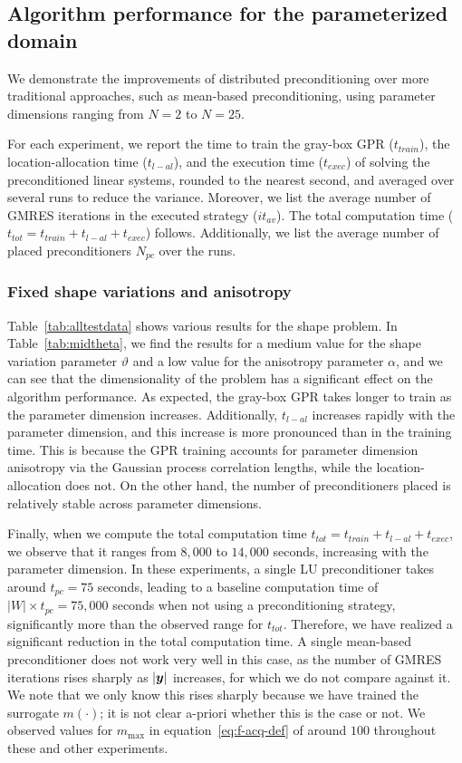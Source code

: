 \subsection{Algorithm performance for the parameterized domain}\label{subsec:conventional_comparison}
We demonstrate the improvements of distributed preconditioning over more traditional approaches, such as mean-based preconditioning, using parameter dimensions ranging from $N=2$ to $N=25$.

For each experiment, we report the time to train the gray-box GPR ($t_{train}$), the location-allocation time ($t_{l-al}$), and the execution time ($t_{exec}$) of solving the preconditioned linear systems, rounded to the nearest second, and averaged over several runs to reduce the variance.
Moreover, we list the average number of GMRES iterations in the executed strategy ($it_{av}$).
The total computation time ($t_{tot}=t_{train} + t_{l-al}+t_{exec}$) follows.
Additionally, we list the average number of placed preconditioners $N_{pc}$ over the runs.

\subsubsection{Fixed shape variations and anisotropy}
Table~\ref{tab:alltestdata} shows various results for the shape problem.
In Table~\ref{tab:midtheta}, we find the results for a medium value for the shape variation parameter $\vartheta$ and a low value for the anisotropy parameter $\alpha$, and we can see that the dimensionality of the problem has a significant effect on the algorithm performance.
As expected, the gray-box GPR takes longer to train as the parameter dimension increases.
Additionally, $t_{l-al}$ increases rapidly with the parameter dimension, and this increase is more pronounced than in the training time.
This is because the GPR training accounts for parameter dimension anisotropy via the Gaussian process correlation lengths, while the location-allocation does not.
On the other hand, the number of preconditioners placed is relatively stable across parameter dimensions.

Finally, when we compute the total computation time $t_{tot}=t_{train} + t_{l-al} + t_{exec}$, we observe that it ranges from $8,000$ to $14,000$ seconds, increasing with the parameter dimension.
In these experiments, a single LU preconditioner takes around $t_{pc}=75$ seconds, leading to a baseline computation time of $|W|\times t_{pc}=75,000$ seconds when not using a preconditioning strategy, significantly more than the observed range for $t_{tot}$.
Therefore, we have realized a significant reduction in the total computation time.
A single mean-based preconditioner does not work very well in this case, as the number of GMRES iterations rises sharply as $\left| {\bm{y}} \right|$ increases, for which we do not compare against it.
We note that we only know this rises sharply because we have trained the surrogate $m(\cdot)$; it is not clear a-priori whether this is the case or not.
We observed values for $m_{\max}$ in equation~\eqref{eq:f-acq-def} of around $100$ throughout these and other experiments.


